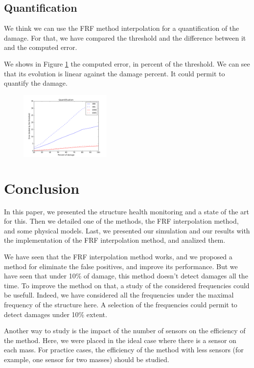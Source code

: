 \documentclass[journal]{IEEEtran}
\begin{document}
\subsection{Quantification}

We think we can use the FRF method interpolation for a quantification of the damage. For that, we have compared the threshold and the difference between it and the computed error.

We shows in Figure \ref{quant} the computed error, in percent of the threshold. We can see that its evolution is linear against the damage percent.
It could permit to quantify the damage.

\begin{figure}[h!]
  \centering
  \includegraphics[width=0.4\textwidth]{images/quantification.png}
  \caption{}
  \label{quant}
\end{figure}


\section{Conclusion}

In this paper, we presented the structure health monitoring and a state of the art for this. Then we detailed one of the methods, the FRF interpolation method, and some physical models. Last, we presented our simulation and our results with the implementation of the FRF interpolation method, and analized them.

We have seen that the FRF interpolation method works, and we proposed a method for eliminate the false positives, and improve its performance. But we have seen that under 10\% of damage, this method doesn't detect damages all the time. To improve the method on that, a study of the considered frequencies could be usefull. Indeed, we have considered all the frequencies under the maximal frequency of the structure here. A selection of the frequencies could permit to detect damages under 10\% extent.

Another way to study is the impact of the number of sensors on the efficiency of the method. Here, we were placed in the ideal case where there is a sensor on each mass. For practice cases, the efficiency of the method with less sensors (for example, one sensor for two masses) should be studied.

\printbibliography
\end{document}
